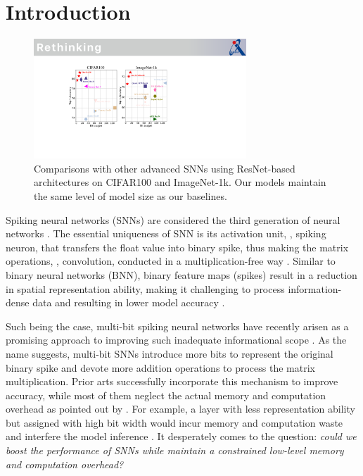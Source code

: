 \section{Introduction}
\label{sec:intro}






\begin{figure}[t]
  \centering
  \includegraphics[width= 8cm]{figs/intro.pdf}
  \caption{Comparisons with other advanced SNNs using ResNet-based architectures on CIFAR100 and ImageNet-1k. Our models maintain the same level of model size as our baselines.}
  \label{fig:intro}
\end{figure}


Spiking neural networks (SNNs) are considered the third generation of neural networks \cite{maass1997networks}. The essential uniqueness of SNN is its activation unit, \ie, spiking neuron, that transfers the float value into binary spike, thus making the matrix operations, \eg, convolution, conducted in a multiplication-free way \cite{fang2021deep}. Similar to binary neural networks (BNN), binary feature maps (spikes) result in a reduction in spatial representation ability, making it challenging to process information-dense data and resulting in lower model accuracy \cite{zhu2019binary, meng2022training,zhou2022spikformer}.

Such being the case, multi-bit spiking neural networks have recently arisen as a promising approach to improving such inadequate informational scope \cite{guo2024ternary, xing2024spikellm,xing2024spikelm,xiao2024multi}. As the name suggests, multi-bit SNNs introduce more bits to represent the original binary spike and devote more addition operations to process the matrix multiplication. Prior arts successfully incorporate this mechanism to improve accuracy, while most of them neglect the actual memory and computation overhead as pointed out by  \cite{shen2024conventional}.
For example, a layer with less representation ability but assigned with high bit width would incur memory and computation waste and interfere the model inference \cite{dong2019hawq,Chen_2021_ICCV}. 
It desperately comes to the 
question: \emph{could we boost the performance of SNNs while maintain a constrained low-level memory and  computation overhead?} 

